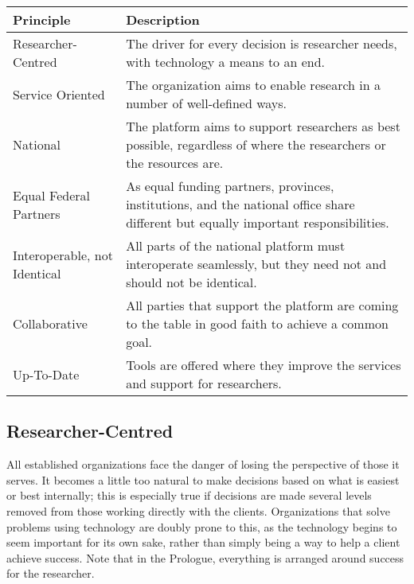 \documentclass[11pt, letterpaper, twoside]{article}
\begin{document}
\begin{table}[ht]
\centering
\small {\sffamily
{}
\begin{tabular}{l|P{3.5in}}
\textcolor{cdaRed}{\textbf{Principle}} & \textcolor{cdaRed}{\textbf{Description}} \\
\hline
\hline
Researcher-Centred & The driver for every decision is researcher needs, with technology a means to an end. \\
Service Oriented & The organization aims to enable research in a number of well-defined ways. \\
National & The platform aims to support researchers as best possible, regardless of where the researchers or the resources are. \\
Equal Federal Partners & As equal funding partners, provinces, institutions, and the national office share different but equally important responsibilities. \\
Interoperable, not Identical & All parts of the national platform must interoperate seamlessly, but they need not and should not be identical. \\
Collaborative & All parties that support the platform are coming to the table in good faith to achieve a common goal. \\
Up-To-Date & Tools are offered where they improve the services and support for researchers. \\
\hline
\end{tabular}
}
\end{table}

\subsection*{Researcher-Centred}
%


All established organizations face the danger of losing the perspective
of those it serves. It becomes a little too natural to make decisions
based on what is easiest or best internally; this is especially true if
decisions are made several levels removed from those working directly
with the clients. Organizations that solve problems using technology are
doubly prone to this, as the technology begins to seem important for its
own sake, rather than simply being a way to help a client achieve
success. Note that in the Prologue, everything is arranged around
success for the researcher.
\end{document}
